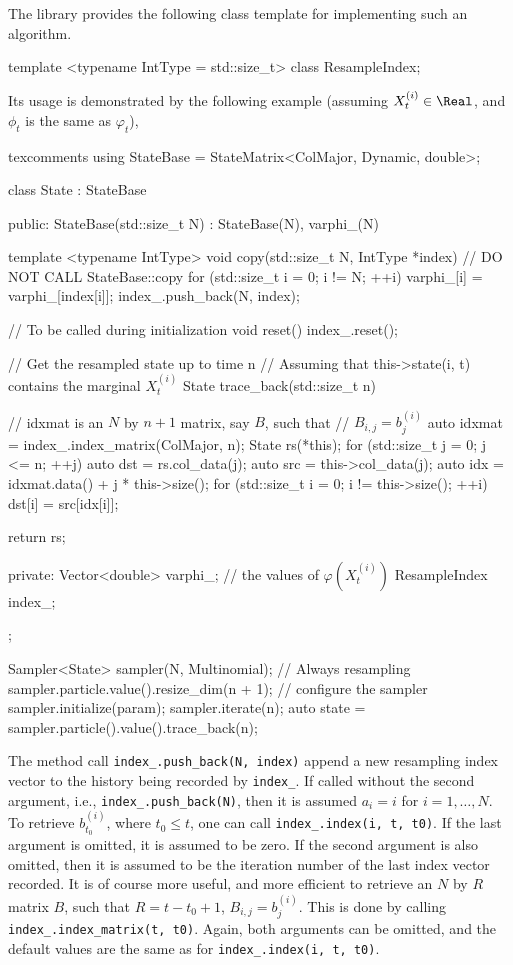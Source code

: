 The library provides the following class template for implementing such an
algorithm.
\begin{cppcode}
template <typename IntType = std::size_t>
class ResampleIndex;
\end{cppcode}
Its usage is demonstrated by the following example (assuming
$X_t^{(i)}\in\Real$, and $\phi_t$ is the same as $\varphi_t$),
\begin{cppcode*}{texcomments}
  using StateBase = StateMatrix<ColMajor, Dynamic, double>;

  class State : StateBase
  {
      public:
      StateBase(std::size_t N) : StateBase(N), varphi_(N) {}

      template <typename IntType>
      void copy(std::size_t N, IntType *index)
      {
          // DO NOT CALL StateBase::copy
          for (std::size_t i = 0; i != N; ++i)
              varphi_[i] = varphi_[index[i]];
          index_.push_back(N, index);
      }

      // To be called during initialization
      void reset() { index_.reset(); }

      // Get the resampled state up to time n
      // Assuming that this->state(i, t) contains the marginal $X_t^{(i)}$
      State trace_back(std::size_t n)
      {
          // idxmat is an $N$ by $n + 1$ matrix, say $B$, such that
          // $B_{i,j} = b_j^{(i)}$
          auto idxmat = index_.index_matrix(ColMajor, n);
          State rs(*this);
          for (std::size_t j = 0; j <= n; ++j) {
              auto dst = rs.col_data(j);
              auto src = this->col_data(j);
              auto idx = idxmat.data() + j * this->size();
              for (std::size_t i = 0; i != this->size(); ++i)
                  dst[i] = src[idx[i]];
          }

          return rs;
      }

      private:
      Vector<double> varphi_; // the values of $\varphi(X_t^{(i)})$
      ResampleIndex index_;
  };

  Sampler<State> sampler(N, Multinomial); // Always resampling
  sampler.particle.value().resize_dim(n + 1);
  // configure the sampler
  sampler.initialize(param);
  sampler.iterate(n);
  auto state = sampler.particle().value().trace_back(n);
\end{cppcode*}
The method call \verb|index_.push_back(N, index)| append a new resampling index
vector to the history being recorded by \verb|index_|. If called without the
second argument, i.e., \verb|index_.push_back(N)|, then it is assumed $a_i = i$
for $i = 1,\dots,N$. To retrieve $b_{t_0}^{(i)}$, where $t_0 \le t$, one can
call \verb|index_.index(i, t, t0)|. If the last argument is omitted, it is
assumed to be zero. If the second argument is also omitted, then it is assumed
to be the iteration number of the last index vector recorded. It is of course
more useful, and more efficient to retrieve an $N$ by $R$ matrix $B$, such that
$R = t - t_0 + 1$, $B_{i,j} = b_j^{(i)}$. This is done by calling
\verb|index_.index_matrix(t, t0)|. Again, both arguments can be omitted, and
the default values are the same as for \verb|index_.index(i, t, t0)|.


